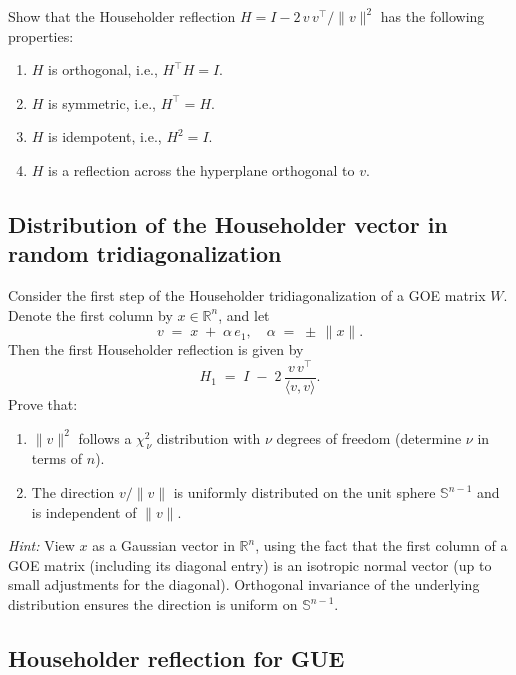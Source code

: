 \documentclass[letterpaper,11pt,oneside,reqno]{book}
\numberwithin{equation}{chapter}  %
\theoremstyle{definition}
\begin{document}
Show that the Householder reflection \(H = I - 2\,v\,v^\top/\|v\|^2\) has the following properties:
\begin{enumerate}
	\item \(H\) is orthogonal, i.e., \(H^\top H = I\).
	\item \(H\) is symmetric, i.e., \(H^\top = H\).
	\item \(H\) is idempotent, i.e., \(H^2 = I\).
	\item \(H\) is a reflection across the hyperplane orthogonal to \(v\).
\end{enumerate}

\subsection{Distribution of the Householder vector in random tridiagonalization}
\label{lecture3:prob:householder-vector}

Consider the first step of the Householder tridiagonalization of a GOE matrix \(W\). Denote the first column by \(x \in \mathbb{R}^n\), and let
\[
   v \;=\; x \;+\;\alpha \,e_1,\quad
   \alpha \;=\; \pm\,\|x\|.
\]
Then the first Householder reflection is given by
\[
   H_1 \;=\; I \;-\; 2 \,\frac{v\,v^\top}{\langle v,v\rangle}.
\]
Prove that:
\begin{enumerate}
  \item \(\|v\|^2\) follows a \(\chi^2_{\,\nu}\) distribution with \(\nu\) degrees of freedom (determine \(\nu\) in terms of \(n\)).
  \item The direction \(v / \|v\|\) is uniformly distributed on the unit sphere \(\mathbb{S}^{n-1}\) and is independent of \(\|v\|\).
\end{enumerate}

\medskip
\noindent
\emph{Hint:}
View \(x\) as a Gaussian vector in \(\mathbb{R}^n\), using the fact that the first column of a GOE matrix (including its diagonal entry) is an isotropic normal vector (up to small adjustments for the diagonal). Orthogonal invariance of the underlying distribution ensures the direction is uniform on \(\mathbb{S}^{n-1}\).

\subsection{Householder reflection for GUE}
\end{document}
